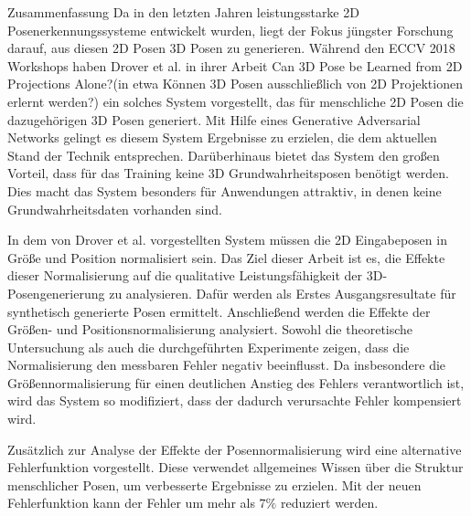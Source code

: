 \pagebreak
\begin{polyabstract}{Zusammenfassung}
	Da in den letzten Jahren leistungsstarke 2D Posenerkennungssysteme entwickelt wurden, liegt der Fokus jüngster Forschung darauf, aus diesen 2D Posen 3D Posen zu generieren.
	Während den ECCV 2018 Workshops haben Drover et al. in ihrer Arbeit \glqq Can 3D Pose be Learned from 2D Projections Alone?\grqq (in etwa \glqq Können 3D Posen ausschließlich von 2D Projektionen erlernt werden?\grqq) ein solches System vorgestellt, das für menschliche 2D Posen die dazugehörigen 3D Posen generiert.
	Mit Hilfe eines Generative Adversarial Networks gelingt es diesem System Ergebnisse zu erzielen, die dem aktuellen Stand der Technik entsprechen.
	Darüberhinaus bietet das System den großen Vorteil, dass für das Training keine 3D Grundwahrheitsposen benötigt werden.
	Dies macht das System besonders für Anwendungen attraktiv, in denen keine Grundwahrheitsdaten vorhanden sind.
	
	In dem von Drover et al. vorgestellten System müssen die 2D Eingabeposen in Größe und Position normalisiert sein.
	Das Ziel dieser Arbeit ist es, die Effekte dieser Normalisierung auf die qualitative Leistungsfähigkeit der 3D-Posengenerierung zu analysieren.
	Dafür werden als Erstes Ausgangsresultate für synthetisch generierte Posen ermittelt.
	Anschließend werden die Effekte der Größen- und Positionsnormalisierung analysiert.
	Sowohl die theoretische Untersuchung als auch die durchgeführten Experimente zeigen, dass die Normalisierung den messbaren Fehler negativ beeinflusst.
	Da insbesondere die Größennormalisierung für einen deutlichen Anstieg des Fehlers verantwortlich ist, wird das System so modifiziert, dass der dadurch verursachte Fehler kompensiert wird.
	
	Zusätzlich zur Analyse der Effekte der Posennormalisierung wird eine alternative Fehlerfunktion vorgestellt.
	Diese verwendet allgemeines Wissen über die Struktur menschlicher Posen, um verbesserte Ergebnisse zu erzielen.
	Mit der neuen Fehlerfunktion kann der Fehler um mehr als $7\%$ reduziert werden. 
\end{polyabstract}
